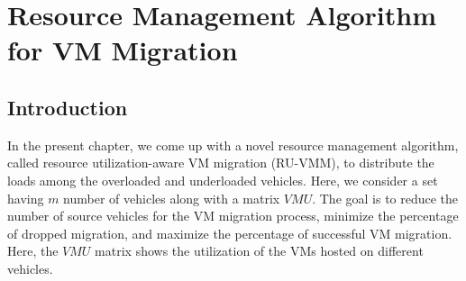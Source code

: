 \chapter{Resource Management Algorithm for VM Migration}
\section{Introduction}
In the present chapter, we come up with a novel resource management algorithm, called resource utilization-aware VM migration  (RU-VMM), to distribute the loads among the overloaded and underloaded vehicles. Here, we consider a set having $m$ number of vehicles along with a matrix $VMU$. The goal is to reduce the number of source vehicles for the VM migration process, minimize the percentage of dropped migration, and maximize the percentage of successful VM migration. Here, the $VMU$ matrix shows the utilization of the VMs hosted on different vehicles.











